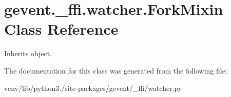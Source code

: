 \hypertarget{classgevent_1_1__ffi_1_1watcher_1_1_fork_mixin}{}\section{gevent.\+\_\+ffi.\+watcher.\+Fork\+Mixin Class Reference}
\label{classgevent_1_1__ffi_1_1watcher_1_1_fork_mixin}


Inherits object.



The documentation for this class was generated from the following file\+:\begin{DoxyCompactItemize}
\item 
venv/lib/python3./site-\/packages/gevent/\+\_\+ffi/watcher.\+py\end{DoxyCompactItemize}
